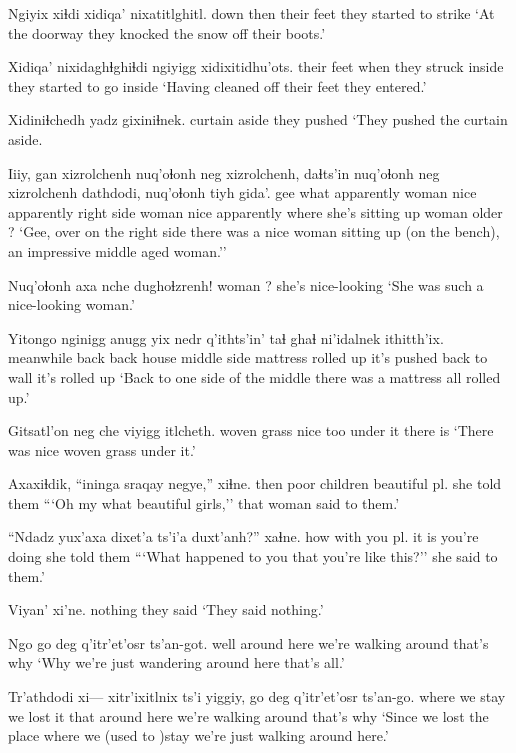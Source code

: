 \documentclass[12pt]{article}
\begin{document}
\gll Ngiyix xiɬdi xidiqa' nixatitlghitl.
down then {their feet} {they started to strike}
\glt `At the doorway they knocked the snow off their boots.'
\glend

\gll Xidiqa' nixidaghɬghiɬdi ngiyigg xidixitidhu'ots.
{their feet} {when they struck} inside {they started to go inside}
\glt `Having cleaned off their feet they entered.'
\glend

\gll Xidiniɬchedh yadz gixiniɬnek.
curtain aside {they pushed}
\glt `They pushed the curtain aside. 
\glend

\gll Iiiy, gan xizrolchenh nuq'oɬonh neg xizrolchenh, daɬts'in nuq'oɬonh neg xizrolchenh dathdodi, nuq'oɬonh tiyh gida'.
gee what apparently woman nice apparently {right side} woman nice apparently {where she's sitting up} woman older ? 
\glt `Gee, over on the right side there was a nice woman sitting up (on the bench), an impressive middle aged woman.''
\glend

\gll Nuq'oɬonh {axa nche} dughoɬzrenh!
woman ? {she's nice-looking}
\glt `She was such a nice-looking woman.'
\glend

\gll Yitongo nginigg anugg yix nedr q'ithts'in' taɬ ghaɬ ni'idalnek ithitth'ix.
meanwhile back back house middle side mattress {rolled up} {it's pushed back to wall} {it's rolled up}
\glt `Back to one side of the middle there was a mattress all rolled up.'
\glend

\gll Gitsatl'on neg che viyigg itlcheth.
{woven grass} nice too {under it} {there is}
\glt `There was nice woven grass under it.'
\glend

\gll Axaxiɬdik, ``ininga sraqay negye,'' xiɬne.
then poor children {beautiful pl.} {she told them}
\glt ```Oh my what beautiful girls,'' that woman said to them.'
\glend

\gll ``Ndadz yux'axa dixet'a ts'i'a duxt'anh?'' xaɬne.
how {with you pl.} {it is} {} {you're doing} {she told them}
\glt ```What happened to you that you're like this?'' she said to them.'
\glend

\gll Viyan' xi'ne.
nothing {they said}
\glt `They said nothing.'
\glend

\gll Ngo {go deg} q'itr'et'osr ts'an-got.
well {around here} {we're walking around} {that's why}
\glt `Why we're just wandering around here that's all.'
\glend

\gll Tr'athdodi xi--- xitr'ixitlnix ts'i yiggiy, {go deg} q'itr'et'osr ts'an-go.
{where we stay} {} {we lost it} {} that  {around here} {we're walking around} {that's why}
\glt `Since we lost the place where we (used to )stay we're just walking around here.'
\glend
\end{document}
